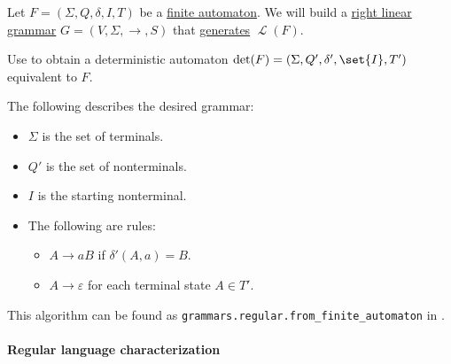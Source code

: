 \begin{algorithm}\label{alg:finite_automaton_to_right_linear_grammar}
  Let \( F = (\Sigma, Q, \delta, I, T) \) be a \hyperref[def:finite_automaton]{finite automaton}. We will build a \hyperref[def:chomsky_hierarchy/regular]{right linear grammar} \( G = (V, \Sigma, \to, S) \) that \hyperref[def:formal_grammar/language]{generates} \( \mscrL(F) \).

  \begin{thmenum}
     Use  to obtain a deterministic automaton \( \det(F) = (\Sigma, Q', \delta', \set{ I }, T') \) equivalent to \( F \).

     The following describes the desired grammar:
    \begin{itemize}
      \item \( \Sigma \) is the set of terminals.
      \item \( Q' \) is the set of nonterminals.
      \item \( I \) is the starting nonterminal.
      \item The following are rules:
      \begin{itemize}
        \item \( A \to aB \) if \( \delta'(A, a) = B \).
        \item \( A \to \varepsilon \) for each terminal state \( A \in T' \).
      \end{itemize}
    \end{itemize}
  \end{thmenum}
\end{algorithm}
\begin{comments}
  \item This algorithm can be found as \texttt{grammars.regular.from\_finite\_automaton} in \cite{code}.
\end{comments}

\paragraph{Regular language characterization}

